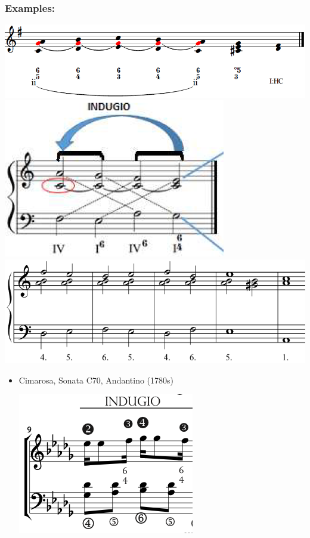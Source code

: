 ﻿\documentclass[11pt, openany]{article}
\begin{document}
\begin{itemize}
\subsubsection{Examples:}
\begin{center}
\includegraphics[scale=0.5]{indugio1.png}\\
\includegraphics[scale=0.5]{indugio2.png}\\
\includegraphics[scale=0.5]{indugio3.png}
\end{center}
\begin{itemize}
\item Cimarosa, Sonata C70, Andantino (1780s)
\begin{center}
\includegraphics[scale=0.5]{cimarosa70.png}

\end{center}
\end{itemize}
\end{itemize}
\end{document}
